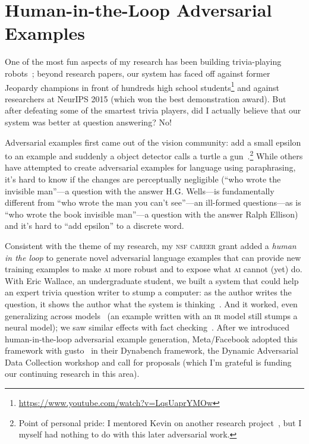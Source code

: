 \documentclass[11pt]{amsart}
\newcommand{\abr}[1]{\textsc{#1}}
\begin{document}

\section{Human-in-the-Loop Adversarial Examples}

One of the most fun aspects of my research has been building
trivia-playing robots~\cite{boyd-graber-12,iyyer-14b,iyyer-15}; beyond research papers, our system has faced off against former Jeopardy
champions in front of hundreds high school
students\footnote{\url{https://www.youtube.com/watch?v=LqsUaprYMOw}}
and against researchers at NeurIPS 2015 (which won the best
demonstration award).
%
But after defeating some of the smartest trivia players, did I
actually believe that our system was better at question answering?
%
No!

Adversarial examples first came out of the vision community: add a
small epsilon to an example and suddenly a object detector calls a
turtle a gun~\cite{athalye-18}.\footnote{Point of personal pride: I
mentored Kevin on another research project~\cite{he-16}, but
I myself had nothing to do with this later adversarial work.}
%
While others have attempted to create adversarial examples for
language using paraphrasing, it's hard to know if the changes are
perceptually negligible (``who wrote the invisible man''---a question with the answer H.G. Wells---is
fundamentally different from ``who wrote the man you can't see''---an ill-formed questions---as is
``who wrote the book invisible man''---a question with the answer Ralph Ellison) and
it's hard to ``add epsilon'' to a discrete word.

Consistent with the theme of my research, my \abr{nsf career} grant
added a \emph{human in the loop} to generate novel adversarial
language examples that can provide new training examples to make
\abr{ai} more robust and to expose what \abr{ai} cannot (yet) do.
%
With Eric Wallace, an undergraduate student, we built a system that
could help an expert trivia question writer to stump a computer: as
the author writes the question, it shows the author what the system is
thinking~\cite{wallace-18}.
%
And it worked, even generalizing across models~\cite{wallace-19} (an
example written with an \abr{ir} model still stumps a neural model); we saw similar effects with fact checking~\cite{eisenschlos-21}.
%
After we introduced human-in-the-loop adversarial example generation,
Meta/Facebook adopted this framework with gusto~\cite{bartolo-20} in
their Dynabench framework, the Dynamic Adversarial Data Collection
workshop and call for proposals (which I'm grateful is funding our
continuing research in this area).
\end{document}
